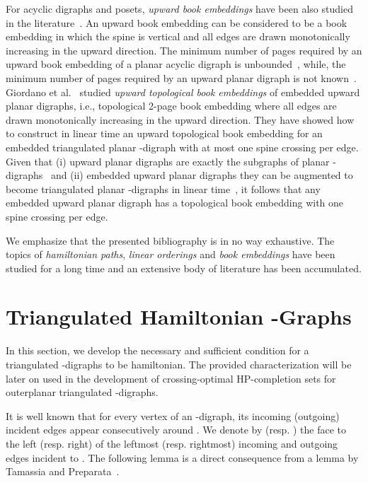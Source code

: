 \documentclass{myllncs-mixalis}
\begin{document}
For acyclic digraphs and posets, \emph{upward book embeddings} have
been also studied in the
literature~\cite{AlzohairiR96,HeathP97,HeathP99,HeathPT99,NowakowskiP89}.
An upward book embedding can be considered to be a book embedding in
which the spine is vertical and all edges are drawn monotonically
increasing in the upward direction.  The minimum number of pages
required by an upward book embedding of a planar acyclic digraph is
unbounded~\cite{HeathP97}, while, the minimum number of pages
required by an upward planar digraph is not
known~\cite{AlzohairiR96,HeathP97,NowakowskiP89}. Giordano et
al.~\cite{GiordanoLMS07} studied \emph{upward topological book
embeddings} of embedded upward planar digraphs, i.e., topological
2-page book embedding where all edges are drawn monotonically
increasing in the upward direction. They have showed how to
construct in linear time an upward topological book embedding for an
embedded triangulated planar -digraph with at most one spine
crossing per edge. Given that (i) upward planar digraphs are exactly
the subgraphs of planar -digraphs~\cite{DiBattistaT88,Kelly87}
and (ii) embedded upward planar digraphs they can be augmented to
become triangulated planar -digraphs in linear
time~\cite{GiordanoLMS07}, it follows that any embedded upward
planar digraph has a topological book embedding with one spine
crossing per edge.

We emphasize that the presented bibliography is in no way
exhaustive. The topics of \emph{hamiltonian paths}, \emph{linear
orderings} and \emph{book embeddings} have been studied for a long
time and an extensive body of literature has been accumulated.



\section{Triangulated Hamiltonian -Graphs}

In this section, we develop the necessary and sufficient condition
for a triangulated -digraphs to be hamiltonian. The provided
characterization will be later on used in the development of
crossing-optimal HP-completion sets for outerplanar triangulated
-digraphs.

It is well known\cite{TamassiaT86} that for every vertex  of an
-digraph, its incoming (outgoing) incident edges appear
consecutively around . We denote by  (resp. )
the face to the left (resp. right) of the leftmost (resp. rightmost)
incoming and outgoing edges incident to . The following lemma is
a direct consequence from a lemma by Tamassia and
Preparata~\cite[Lemma 7]{TamassiaP90}.
\end{document}
